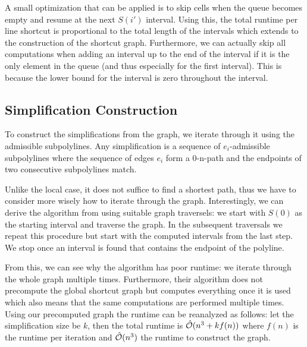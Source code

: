 A small optimization that can be applied is to skip cells when the queue becomes empty and resume at the next \(S(i')\) interval. Using this, the total runtime per line shortcut is proportional to the total length of the intervals which extends to the construction of the shortcut graph. Furthermore, we can actually skip all computations when adding an interval up to the end of the interval if it is the only element in the queue (and thus especially for the first interval). This is because the lower bound for the interval is zero throughout the interval.

\subsection{Simplification Construction}\label{ssec:simplification_construction}

To construct the simplifications from the graph, we iterate through it using the admissible subpolylines. Any simplification is a sequence of \(e_i\)-admissible subpolylines where the sequence of edges \(e_i\) form a 0-n-path and the endpoints of two consecutive subpolylines match.

Unlike the local case, it does not suffice to find a shortest path, thus we have to consider more wisely how to iterate through the graph. Interestingly, we can derive the algorithm from \citeauthor{on_optimal_polyline_simplification_using_the_hausdorff_and_frechet_distance} using suitable graph traversels: we start with \(S(0)\) as the starting interval and traverse the graph. In the subsequent traversals we repeat this procedure but start with the computed intervals from the last step. We stop once an interval is found that contains the endpoint of the polyline.

From this, we can see why the \citeauthor{on_optimal_polyline_simplification_using_the_hausdorff_and_frechet_distance} algorithm has poor runtime: we iterate through the whole graph multiple times. Furthermore, their algorithm does not precompute the global shortcut graph but computes everything once it is used which also means that the same computations are performed multiple times. Using our precomputed graph the runtime can be reanalyzed as follows: let the simplification size be \(k\), then the total runtime is \(\hat{\mathcal{O}}(n^3 + kf(n))\) where \(f(n)\) is the runtime per iteration and \(\hat{\mathcal{O}}(n^3)\) the runtime to construct the graph.

